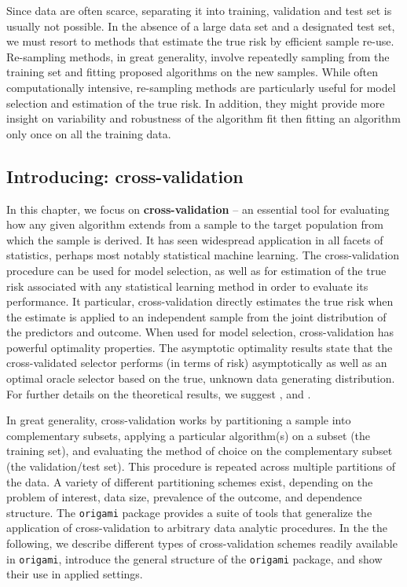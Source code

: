 \documentclass[12pt, krantz2,]{book}
\theoremstyle{definition}
\theoremstyle{definition}
\theoremstyle{definition}
\newcommand{\1}{\mathbbm{1}}
\begin{document}
Since data are often scarce, separating it into training, validation and test
set is usually not possible. In the absence of a large data set and a designated
test set, we must resort to methods that estimate the true risk by efficient
sample re-use. Re-sampling methods, in great generality, involve repeatedly
sampling from the training set and fitting proposed algorithms on the new
samples. While often computationally intensive, re-sampling methods are
particularly useful for model selection and estimation of the true risk. In
addition, they might provide more insight on variability and robustness of the
algorithm fit then fitting an algorithm only once on all the training data.

\hypertarget{introducing-cross-validation}{%
\subsection{Introducing: cross-validation}\label{introducing-cross-validation}}

In this chapter, we focus on \textbf{cross-validation} -- an essential tool for
evaluating how any given algorithm extends from a sample to the target
population from which the sample is derived. It has seen widespread application
in all facets of statistics, perhaps most notably statistical machine learning.
The cross-validation procedure can be used for model selection, as well as for
estimation of the true risk associated with any statistical learning method in
order to evaluate its performance. It particular, cross-validation directly
estimates the true risk when the estimate is applied to an independent sample
from the joint distribution of the predictors and outcome. When used for model
selection, cross-validation has powerful optimality properties. The asymptotic
optimality results state that the cross-validated selector performs (in terms of
risk) asymptotically as well as an optimal oracle selector based on the true,
unknown data generating distribution. For further details on the theoretical
results, we suggest \citet{vdl2004asymptotic}, \citet{dudoit2005asymptotics} and
\citet{vaart2006oracle}.

In great generality, cross-validation works by partitioning a sample into
complementary subsets, applying a particular algorithm(s) on a subset (the
training set), and evaluating the method of choice on the complementary subset
(the validation/test set). This procedure is repeated across multiple partitions
of the data. A variety of different partitioning schemes exist, depending on the
problem of interest, data size, prevalence of the outcome, and dependence
structure. The \texttt{origami} package provides a suite of tools that generalize the
application of cross-validation to arbitrary data analytic procedures. In the
the following, we describe different types of cross-validation schemes readily
available in \texttt{origami}, introduce the general structure of the \texttt{origami}
package, and show their use in applied settings.
\end{document}
